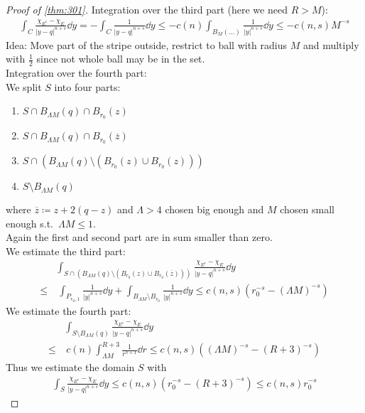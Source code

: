\begin{proof}[Proof of \cref{thm:301}]
	Integration over the third part (here we need \( R > M \)):
	\begin{align*}
		\int_C \frac{\chi_{E^c} -\chi_E}{\lvert y-q\rvert^{n+s}} \dd{y} = - \int_C \frac{1}{\lvert y-q \rvert^{n+s}} \dd{y} \leq -c(n) \int_{B_M (\ldots)} \frac{1}{\lvert y\rvert^{n+s}} \dd{y} \leq -c(n,s) M^{-s}
	\end{align*}
	Idea: Move part of the stripe outside, restrict to ball with radius \( M \) and
	multiply with \( \frac{1}{2} \) since not whole ball may be in the set.\\

	Integration over the fourth part: \\
	We split \( S \) into four parts:
	\begin{enumerate}[label = \roman*)]
		\item \( S \cap B_{\Lambda M} (q) \cap B_{r_0}(z) \)
		\item \( S \cap B_{\Lambda M} (q) \cap B_{r_0}( \overline{z}) \)
		\item \( S \cap (B_{\Lambda M} (q)\setminus ( B_{r_0}(z) \cup B_{r_0}(z))) \)
		\item \( S \setminus B_{\Lambda M} (q) \)
	\end{enumerate}
	where \( \overline{z}\coloneqq z + 2(q-z) \) and \( \Lambda > 4 \) chosen big enough
	and \( M \) chosen small enough s.t.\ \( \Lambda M \leq 1 \). \\
	Again the first and second part are in sum smaller than zero. \\
	We estimate the third part:
	\begin{align*}
		     & \int_{S \cap (B_{\Lambda M} (q)\setminus ( B_{r_0}(z) \cup B_{r_0}(\overline{z})))} \frac{\chi_{E^c} -\chi_E}{\lvert y-q\rvert^{n+s}} \dd{y} \\
		\leq & \ \int_{P_{r_0, 1}} \frac{1}{\lvert y\rvert^{n+s}} \dd{y} + \int_{B_{\Lambda M}\setminus B_{r_0}} \frac{1}{\lvert y\rvert^{n+s}} \dd{y} \leq c(n,s) (r_0^{-s} - (\Lambda M)^{-s})
	\end{align*}
	We estimate the fourth part:
	\begin{align*}
		     & \int_{S \setminus B_{\Lambda M}(q)} \frac{\chi_{E^c} -\chi_E}{\lvert y-q\rvert^{n+s}} \dd{y} \\
		\leq & \ c(n) \int_{\Lambda M}^{R+3} \frac{1}{r^{s+1}} \dd{r} \leq c(n,s)((\Lambda M)^{-s} - (R+3)^{-s})
	\end{align*}
	Thus we estimate the domain \( S \) with
	\begin{align*}
		\int_S \frac{\chi_{E^c} -\chi_E}{\lvert y-q\rvert^{n+s}} \dd{y} \leq c(n,s)(r_0^{-s} - (R+3)^{-s}) \leq c(n,s) r_0^{-s}

\end{align*}
\end{proof}
